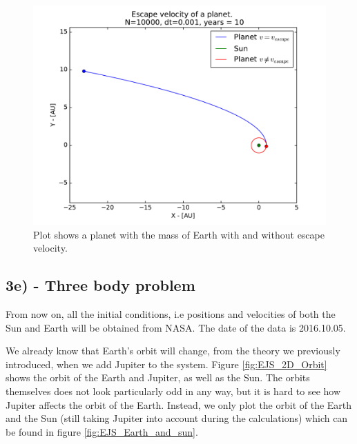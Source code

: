 \documentclass[12pt]{article}
\begin{document}
\begin{figure}[!h]
\centering
\includegraphics[width=\linewidth]{Plots/Escape_velocity.pdf}
\caption{Plot shows a planet with the mass of Earth with and without escape velocity.}
\label{fig:EscapeVel}
\end{figure}
\FloatBarrier

\subsection*{3e) - Three body problem}
From now on, all the initial conditions, i.e positions and velocities of both the Sun and Earth will be obtained from NASA. The date of the data is 2016.10.05.

We already know that Earth's orbit will change, from the theory we previously introduced, when we add Jupiter to the system. Figure \ref{fig:EJS_2D_Orbit} shows the orbit of the Earth and Jupiter, as well as the Sun. The orbits themselves does not look particularly odd in any way, but it is hard to see how Jupiter affects the orbit of the Earth. Instead, we only plot the orbit of the Earth and the Sun (still taking Jupiter into account during the calculations) which can be found in figure \ref{fig:EJS_Earth_and_sun}. 
\end{document}
